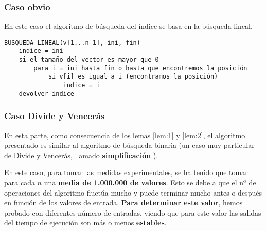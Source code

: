 \subsubsection{Caso obvio}

En este caso el algoritmo de búsqueda del índice se basa en la búsqueda lineal. 

\begin{lstlisting}
BUSQUEDA_LINEAL(v[1...n-1], ini, fin)
    indice = ini
    si el tamaño del vector es mayor que 0
        para i = ini hasta fin o hasta que encontremos la posición
            si v[i] es igual a i (encontramos la posición)
                indice = i
    devolver indice
\end{lstlisting}

% 

\subsubsection{Caso Divide y Vencerás}

En esta parte, como consecuencia de los lemas \ref{lem:1} y \ref{lem:2}, el algoritmo presentado es similar 
al algoritmo de búsqueda binaria (un caso muy particular de Divide y Vencerás, 
llamado \textbf{simplificación} \cite{Verdegay2017}).

En este caso, para tomar las medidas experimentales, se ha tenido que tomar para cada $n$ una \textbf{media de 1.000.000
de valores}. Esto se debe a que el nº de operaciones del algoritmo fluctúa mucho y puede terminar mucho antes o después en función
de los valores de entrada. \textbf{Para determinar este valor}, hemos probado con diferentes número de entradas, 
viendo que para este valor las salidas del tiempo de ejecución son más o menos \textbf{estables}. 

\begin{lstlisting}
    
\end{lstlisting}